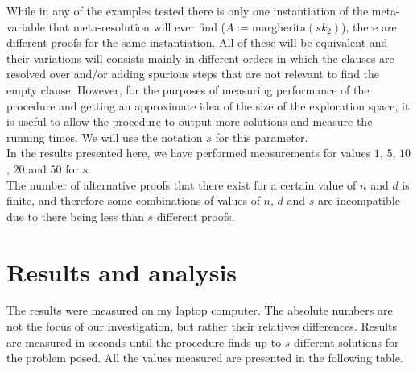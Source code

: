 \documentclass[12pt,a4paper]{article}
\begin{document}
While in any of the examples tested there is only one instantiation of the meta-variable that meta-resolution will ever find ($A := \text{margherita}(sk_2)$), there are different proofs for the same instantiation. All of these will be equivalent and their variations will consists mainly in different orders in which the clauses are resolved over and/or adding spurious steps that are not relevant to find the empty clause. However, for the purposes of measuring performance of the procedure and getting an approximate idea of the size of the exploration space, it is useful to allow the procedure to output more solutions and measure the running times. We will use the notation $s$ for this parameter.\\

In the results presented here, we have performed measurements for values $1$, $5$, $10$, $20$ and $50$ for $s$.\\

The number of alternative proofs that there exist for a certain value of $n$ and $d$ is finite, and therefore some combinations of values of $n$, $d$ and $s$ are incompatible due to there being less than $s$ different proofs.

\section{Results and analysis}

The results were measured on my laptop computer. The absolute numbers are not the focus of our investigation, but rather their relatives differences. Results are measured in seconds until the procedure finds up to $s$ different solutions for the problem posed. All the values measured are presented in the following table.
\end{document}
